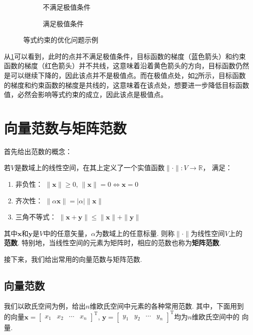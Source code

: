 \begin{solution}
    \begin{figure}[htb!]
        \centering
        \begin{subfigure}{.4\textwidth}
            \centering
            
            \caption{不满足极值条件}
            \label{fig_basic_kkt_eg_1}
        \end{subfigure}
        \begin{subfigure}{.4\textwidth}
            \centering
            
            \caption{满足极值条件}
            \label{fig_basic_kkt_eg_2}
        \end{subfigure}
        \caption{等式约束的优化问题示例}
        \label{fig_basic_kkt_eg}
    \end{figure}

    从\cref{fig_basic_kkt_eg_1}可以看到，此时的点并不满足极值条件，目标函数的梯度（蓝色箭头）和约束函数的梯度（红色箭头）并不共线，这意味着沿着黄色箭头的方向，目标函数仍然是可以继续下降的，因此该点并不是极值点。而在极值点处，如\cref{fig_basic_kkt_eg_2}所示，目标函数的梯度和约束函数的梯度是共线的，这意味着在该点处，想要进一步降低目标函数值，必然会影响等式约束的成立，因此该点是极值点。
\end{solution}

\chapter{向量范数与矩阵范数}\label{apx.matrix-norm}
首先给出范数的概念：

\begin{definition}[范数]
    若$V$是数域上的线性空间，在其上定义了一个实值函数$\|\cdot\|:V \to \mathbb{R}$，
    满足：
    \begin{enumerate}
        \item 非负性： $\|\bm{x}\| \geq 0$, $\|\bm{x}\|=0 \Leftrightarrow \bm{x} =0$
        \item 齐次性： $\|\alpha \bm{x}\|=|\alpha|\|\bm{x}\|$
        \item 三角不等式： $\|\bm{x}+\bm{y}\| \leq \|\bm{x}\|+\|\bm{y}\|$
    \end{enumerate}
    其中\( \bm{x} \)和\( \bm{y} \)是$V$中的任意矢量，$\alpha$为数域上的任意标量. 则称$\|\cdot\|$为线性空间$V$上的\textbf{范数}. 特别地，当线性空间的元素为矩阵时，相应的范数也称为\textbf{矩阵范数}.
\end{definition}

接下来，我们给出常用的向量范数与矩阵范数.

\section{向量范数}
我们以欧氏空间为例，给出$n$维欧氏空间中元素的各种常用范数. 其中，下面用到的向量$\bm{x}=\begin{bmatrix} x_1 & x_2 & \cdots & x_n \end{bmatrix}^{\mathrm{T}}$, $\bm{y}=\begin{bmatrix} y_1 & y_2 & \cdots & y_n \end{bmatrix}^{\mathrm{T}}$均为$n$维欧氏空间中的
向量.


